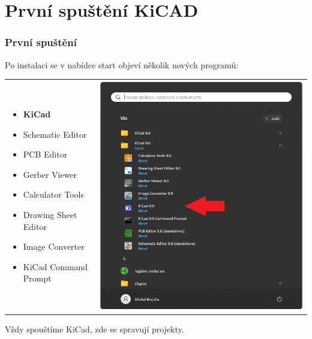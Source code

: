 \documentclass{beamer}
\begin{document}
\section{\texorpdfstring{První spuštění KiCAD}{Prvni spusteni KiCAD}}
	\begin{frame}
    \frametitle{První spuštění}
    \small
    	Po instalaci se v nabídce start objeví několik nových programů:
      \begin{tabular}{ m{6cm} m{2cm} }
         \begin{itemize}
           \item \textbf{KiCad}
           \item Schematic Editor
           \item PCB Editor
           \item Gerber Viewer
           \item Calculator Tools
           \item Drawing Sheet Editor
					 \item Image Converter
					 \item KiCad Command Prompt
         \end{itemize}
         & 
        \begin{minipage}{\textwidth}
          \includegraphics[scale=0.3]{obr/nabStart.png}
        \end{minipage}
				\vspace{0.2cm}
      \end{tabular} 
   
  Vždy spouštíme KiCad, zde se spravují projekty.
	\end{frame}
\end{document}
